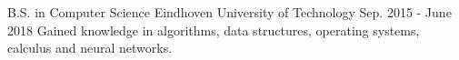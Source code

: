 
\begin{cventries}

  \cventry
    {B.S. in Computer Science} %
    {Eindhoven University of Technology} %
    {} %
    {Sep. 2015 - June 2018} %
    {
      {Gained knowledge in algorithms, data structures, operating systems, calculus and neural networks.}
    }

\end{cventries}
